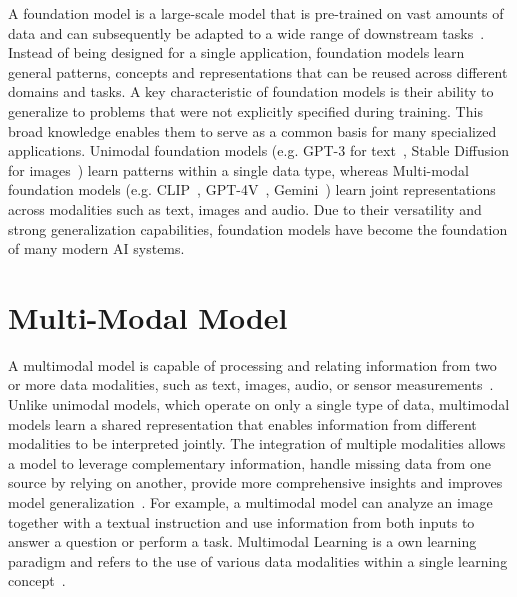 A foundation model is a large-scale model that is pre-trained on vast amounts of data and can subsequently be adapted to a wide range of downstream tasks~\cite{Bommasani2021OnTO}. Instead of being designed for a single application, foundation models learn general patterns, concepts and representations that can be reused across different domains and tasks.
A key characteristic of foundation models is their ability to generalize to problems that were not explicitly specified during training. This broad knowledge enables them to serve as a common basis for many specialized applications. 
Unimodal foundation models (e.g. GPT-3 for text~\cite{Brown2020LanguageMA}, Stable Diffusion for images~\cite{Rombach2021HighResolutionIS}) learn patterns within a single data type, whereas Multi-modal foundation models (e.g. CLIP~\cite{Radford2021LearningTV}, GPT-4V~\cite{Achiam2023GPT4TR}, Gemini~\cite{Reid2024Gemini1U, team2023gemini}) learn joint representations across modalities such as text, images and audio.
Due to their versatility and strong generalization capabilities, foundation models have become the foundation of many modern \ac{AI} systems.



\section{Multi-Modal Model}
A multimodal model is capable of processing and relating information from two or more data modalities, such as text, images, audio, or sensor measurements~\cite{Baltruaitis2017MultimodalML}. Unlike unimodal models, which operate on only a single type of data, multimodal models learn a shared representation that enables information from different modalities to be interpreted jointly.
The integration of multiple modalities allows a model to leverage complementary information, handle missing data from one source by relying on another, provide more comprehensive insights and improves model generalization~\cite{Liang2022FoundationsT}.
For example, a multimodal model can analyze an image together with a textual instruction and use information from both inputs to answer a question or perform a task. 
Multimodal Learning is a own learning paradigm and refers to the use of various data modalities within a single learning concept~\cite{Ngiam2011MultimodalDL, Baltruaitis2017MultimodalML}.







